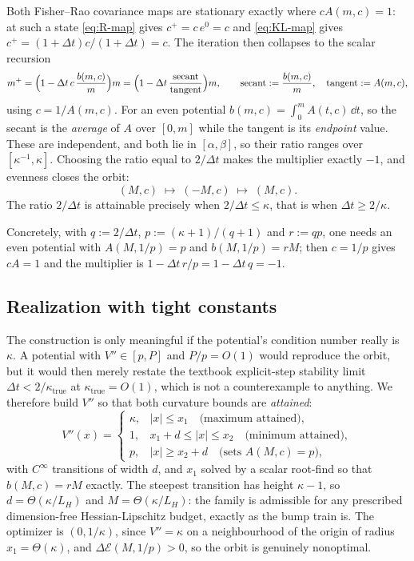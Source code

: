 \documentclass[11pt]{article}
\newcommand{\calE}{\mathcal{E}}
\newcommand{\DeltaE}{\Delta\calE}
\begin{document}
Both Fisher--Rao covariance maps are stationary exactly where $cA(m,c)=1$: at such a
state \eqref{eq:R-map} gives $c^+=c\,e^0=c$ and \eqref{eq:KL-map} gives
$c^+=(1+\Delta t)c/(1+\Delta t)=c$. The iteration then collapses to the scalar
recursion
\begin{equation}\label{eq:multiplier}
    m^+=\Bigl(1-\Delta t\,c\,\frac{b(m,c)}{m}\Bigr)m
      =\Bigl(1-\Delta t\,\frac{\text{secant}}{\text{tangent}}\Bigr)m,
    \qquad
    \text{secant}:=\frac{b(m,c)}m,\quad \text{tangent}:=A(m,c),
\end{equation}
using $c=1/A(m,c)$. For an even potential $b(m,c)=\int_0^mA(t,c)\,\dd t$, so the
secant is the \emph{average} of $A$ over $[0,m]$ while the tangent is its
\emph{endpoint} value. These are independent, and both lie in $[\alpha,\beta]$, so
their ratio ranges over $[\kappa^{-1},\kappa]$. Choosing the ratio equal to
$2/\Delta t$ makes the multiplier exactly $-1$, and evenness closes the orbit:
\begin{equation}\label{eq:orbit}
    (M,c)\;\longmapsto\;(-M,c)\;\longmapsto\;(M,c).
\end{equation}
The ratio $2/\Delta t$ is attainable precisely when $2/\Delta t\le\kappa$, that is
when $\Delta t\ge2/\kappa$.

Concretely, with $q:=2/\Delta t$, $p:=(\kappa+1)/(q+1)$ and $r:=qp$, one needs an even
potential with $A(M,1/p)=p$ and $b(M,1/p)=rM$; then $c=1/p$ gives $cA=1$ and the
multiplier is $1-\Delta t\,r/p=1-\Delta t\,q=-1$.

\subsection{Realization with tight constants}

The construction is only meaningful if the potential's condition number really is
$\kappa$. A potential with $V''\in[p,P]$ and $P/p=O(1)$ would reproduce the orbit,
but it would then merely restate the textbook explicit-step stability limit
$\Delta t<2/\kappa_{\mathrm{true}}$ at $\kappa_{\mathrm{true}}=O(1)$, which is not a
counterexample to anything. We therefore build $V''$ so that both curvature bounds are
\emph{attained}:
\begin{equation}\label{eq:cycle-potential}
    V''(x)=
    \begin{cases}
        \kappa, & |x|\le x_1 \quad\text{(maximum attained)},\\
        1, & x_1+d\le|x|\le x_2 \quad\text{(minimum attained)},\\
        p, & |x|\ge x_2+d \quad\text{(sets $A(M,c)=p$)},
    \end{cases}
\end{equation}
with $C^\infty$ transitions of width $d$, and $x_1$ solved by a scalar root-find so
that $b(M,c)=rM$ exactly. The steepest transition has height $\kappa-1$, so
$d=\Theta(\kappa/L_H)$ and $M=\Theta(\kappa/L_H)$: the family is admissible for any
prescribed dimension-free Hessian-Lipschitz budget, exactly as the bump train is. The
optimizer is $(0,1/\kappa)$, since $V''=\kappa$ on a neighbourhood of the origin of
radius $x_1=\Theta(\kappa)$, and $\DeltaE(M,1/p)>0$, so the orbit is genuinely
nonoptimal.
\end{document}
